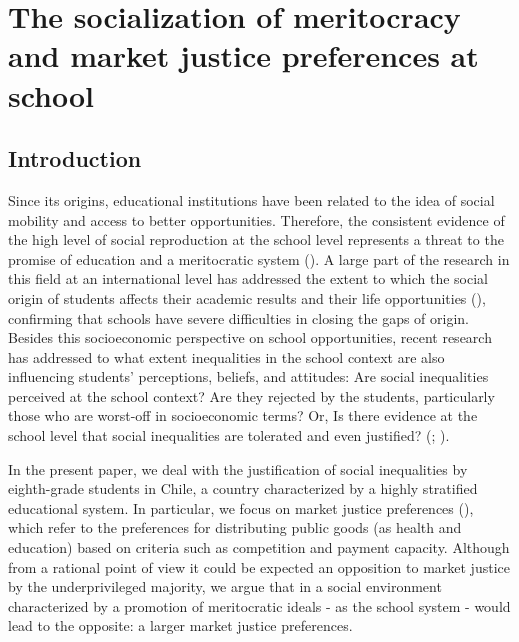 \documentclass[
  letterpaper,
  DIV=11,
  numbers=noendperiod]{scrartcl}
\author{}
\date{}
\begin{document}
\section{The socialization of meritocracy and market justice preferences
at
school}\label{the-socialization-of-meritocracy-and-market-justice-preferences-at-school}

\subsection{Introduction}\label{introduction}

Since its origins, educational institutions have been related to the
idea of social mobility and access to better opportunities. Therefore,
the consistent evidence of the high level of social reproduction at the
school level represents a threat to the promise of education and a
meritocratic system (). A large part of the research in this field at an
international level has addressed the extent to which the social origin
of students affects their academic results and their life opportunities
(),
confirming that schools have severe difficulties in closing the gaps of
origin. Besides this socioeconomic perspective on school opportunities,
recent research has addressed to what extent inequalities in the school
context are also influencing students' perceptions, beliefs, and
attitudes: Are social inequalities perceived at the school context? Are
they rejected by the students, particularly those who are worst-off in
socioeconomic terms? Or, Is there evidence at the school level that
social inequalities are tolerated and even justified?
(;
).

In the present paper, we deal with the justification of social
inequalities by eighth-grade students in Chile, a country characterized
by a highly stratified educational system. In particular, we focus on
market justice preferences (),
which refer to the preferences for distributing public goods (as health
and education) based on criteria such as competition and payment
capacity. Although from a rational point of view it could be expected an
opposition to market justice by the underprivileged majority, we argue
that in a social environment characterized by a promotion of
meritocratic ideals - as the school system - would lead to the opposite:
a larger market justice preferences.
\end{document}

